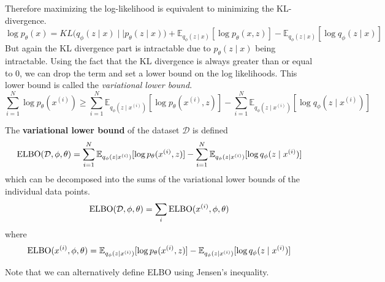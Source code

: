  Therefore maximizing the log-likelihood is equivalent to minimizing the KL-divergence. 
  \begin{equation}
    \log p_\theta (x) = KL \big( q_\phi (z \mid x) \mid\mid p_{\theta} (z \mid x) \big) + \mathbb{E}_{q_{\phi} (z \mid x)} [\log p_{\theta} (x, z)] - \mathbb{E}_{q_\phi(z \mid x)} [ \log q_{\phi} (z \mid x)]
  \end{equation}
  But again the KL divergence part is intractable due to $p_\theta (z \mid x)$ being intractable. Using the fact that the KL divergence is always greater than or equal to $0$, we can drop the term and set a lower bound on the log likelihoods. This lower bound is called the \textit{variational lower bound}.  
  \begin{equation}
    \sum_{i=1}^N \log p_{\theta} (x^{(i)}) \geq \sum_{i=1}^N \mathbb{E}_{q_\phi (z \mid x^{(i)})} [ \log p_{\theta} (x^{(i)}, z)] - \sum_{i=1}^N \mathbb{E}_{q_{\phi} (z \mid x^{(i)})} [ \log q_{\phi} (z \mid x^{(i)}) ]
  \end{equation} 

  \begin{definition}
    The \textbf{variational lower bound} of the dataset $\mathcal{D}$ is defined 
    \begin{equation}
      \elbo(\mathcal{D}, \phi, \theta) = \sum_{i=1}^N \mathbb{E}_{q_\phi (z \mid x^{(i)})} [ \log p_{\theta} (x^{(i)}, z)] - \sum_{i=1}^N \mathbb{E}_{q_{\phi} (z \mid x^{(i)})} [ \log q_{\phi} (z \mid x^{(i)})] 
    \end{equation}
    which can be decomposed into the sums of the variational lower bounds of the individual data points. 
    \begin{equation}
      \elbo(\mathcal{D}, \phi, \theta) = \sum_i \elbo(x^{(i)}, \phi, \theta) 
    \end{equation}
    where 
    \begin{equation}
      \elbo(x^{(i)}, \phi, \theta) = \mathbb{E}_{q_\phi (z \mid x^{(i)})} [ \log p_{\theta} (x^{(i)}, z)] - \mathbb{E}_{q_{\phi} (z \mid x^{(i)})} [ \log q_{\phi} (z \mid x^{(i)})] 
    \end{equation}
  \end{definition}

  Note that we can alternatively define ELBO using Jensen's inequality. 

